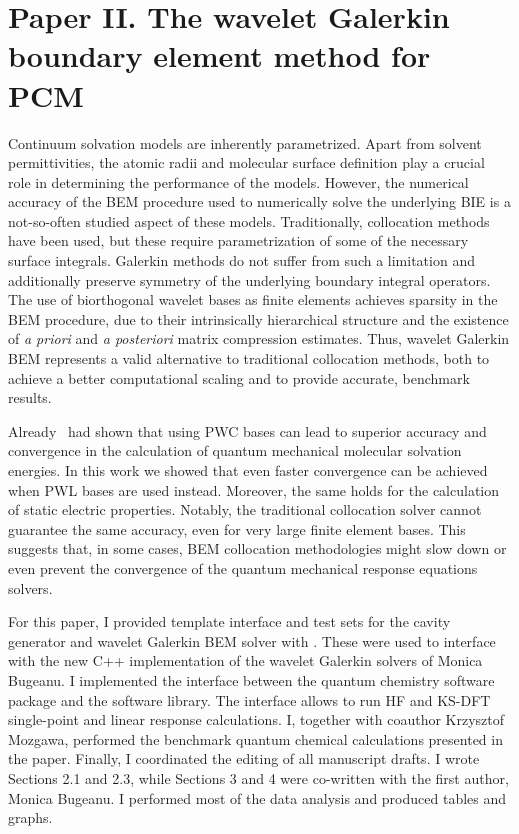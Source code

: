 \section*{Paper II. The wavelet Galerkin boundary element method for PCM}

Continuum solvation models are inherently parametrized. Apart from solvent permittivities,
the atomic radii and molecular surface definition play a crucial role
in determining the performance of the models.
However, the numerical accuracy of the \acs{BEM} procedure used to numerically solve the
underlying \acs{BIE} is a not-so-often studied aspect of these models.
Traditionally, collocation methods have been used, but these require parametrization of some of the necessary surface integrals.
Galerkin methods do not suffer from such a limitation and additionally preserve symmetry of the underlying
boundary integral operators.
The use of biorthogonal wavelet bases as finite elements achieves sparsity in
the \acs{BEM} procedure, due to their intrinsically hierarchical structure and
the existence of \emph{a priori} and \emph{a posteriori} matrix compression
estimates.
Thus, wavelet Galerkin \acs{BEM} represents a valid alternative to traditional
collocation methods, both to achieve a better computational scaling and to
provide accurate, benchmark results.\autocite{Harbrecht2004-uo,
Harbrecht2006-ug, Dahmen2006-pj}

Already~\citeauthor{Weijo2010-hy} had shown that using \ac{PWC} bases can lead
to superior accuracy and convergence in the calculation of quantum mechanical
molecular solvation energies.
In this work we showed that even faster convergence can be achieved when
\ac{PWL} bases are used instead.
Moreover, the same holds for the calculation of static electric properties.
Notably, the traditional collocation solver cannot guarantee the same accuracy,
even for very large finite element bases. This suggests that, in some cases,
\acs{BEM} collocation methodologies might slow down or even prevent the
convergence of the quantum mechanical response equations solvers.

For this paper, I provided template interface and test sets for the cavity
generator\autocite{Harbrecht2009-no, Harbrecht2011-dk} and wavelet Galerkin
\acs{BEM} solver with \pcmsolver.
These were used to interface with the new C++ implementation of the wavelet
Galerkin solvers of Monica Bugeanu.
I implemented the interface between the \LSDALTON quantum chemistry software
package and the \pcmsolver software library. The interface allows to run \acs{HF} and
\acs{KS}-\acs{DFT} single-point and linear response calculations.
I, together with coauthor Krzysztof Mozgawa, performed the benchmark quantum
chemical calculations presented in the paper.
Finally, I coordinated the editing of all manuscript drafts. I wrote Sections 2.1 and 2.3,
while Sections 3 and 4 were co-written with the first author, Monica Bugeanu.
I performed most of the data analysis and produced tables and graphs.

